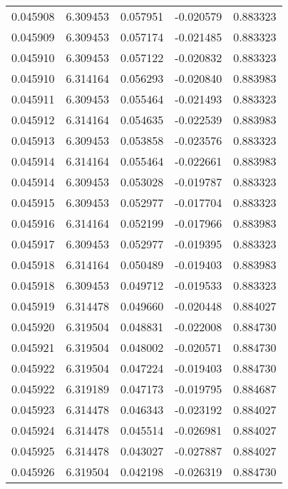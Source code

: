 \begin{tabular}{lrrrr}
0.045908    &  6.309453 &  0.057951 & -0.020579 &             0.883323 \\
0.045909    &  6.309453 &  0.057174 & -0.021485 &             0.883323 \\
0.045910    &  6.309453 &  0.057122 & -0.020832 &             0.883323 \\
0.045910    &  6.314164 &  0.056293 & -0.020840 &             0.883983 \\
0.045911    &  6.309453 &  0.055464 & -0.021493 &             0.883323 \\
0.045912    &  6.314164 &  0.054635 & -0.022539 &             0.883983 \\
0.045913    &  6.309453 &  0.053858 & -0.023576 &             0.883323 \\
0.045914    &  6.314164 &  0.055464 & -0.022661 &             0.883983 \\
0.045914    &  6.309453 &  0.053028 & -0.019787 &             0.883323 \\
0.045915    &  6.309453 &  0.052977 & -0.017704 &             0.883323 \\
0.045916    &  6.314164 &  0.052199 & -0.017966 &             0.883983 \\
0.045917    &  6.309453 &  0.052977 & -0.019395 &             0.883323 \\
0.045918    &  6.314164 &  0.050489 & -0.019403 &             0.883983 \\
0.045918    &  6.309453 &  0.049712 & -0.019533 &             0.883323 \\
0.045919    &  6.314478 &  0.049660 & -0.020448 &             0.884027 \\
0.045920    &  6.319504 &  0.048831 & -0.022008 &             0.884730 \\
0.045921    &  6.319504 &  0.048002 & -0.020571 &             0.884730 \\
0.045922    &  6.319504 &  0.047224 & -0.019403 &             0.884730 \\
0.045922    &  6.319189 &  0.047173 & -0.019795 &             0.884687 \\
0.045923    &  6.314478 &  0.046343 & -0.023192 &             0.884027 \\
0.045924    &  6.314478 &  0.045514 & -0.026981 &             0.884027 \\
0.045925    &  6.314478 &  0.043027 & -0.027887 &             0.884027 \\
0.045926    &  6.319504 &  0.042198 & -0.026319 &             0.884730 \\

\end{tabular}

